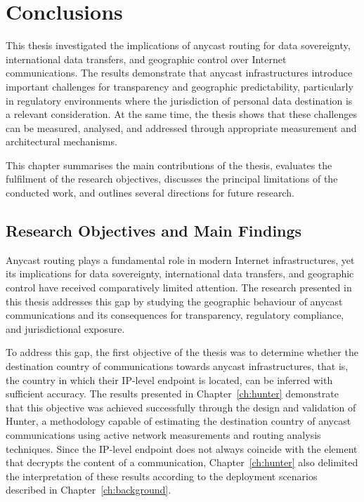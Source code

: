 \chapter{Conclusions}
\label{ch:conclusion}

This thesis investigated the implications of anycast routing for data sovereignty, international data transfers, and geographic control over Internet communications. The results demonstrate that anycast infrastructures introduce important challenges for transparency and geographic predictability, particularly in regulatory environments where the jurisdiction of personal data destination is a relevant consideration. At the same time, the thesis shows that these challenges can be measured, analysed, and addressed through appropriate measurement and architectural mechanisms.

This chapter summarises the main contributions of the thesis, evaluates the fulfilment of the research objectives, discusses the principal limitations of the conducted work, and outlines several directions for future research.

\section{Research Objectives and Main Findings}
\label{sc:conclusion_objectives}

Anycast routing plays a fundamental role in modern Internet infrastructures, yet its implications for data sovereignty, international data transfers, and geographic control have received comparatively limited attention. The research presented in this thesis addresses this gap by studying the geographic behaviour of anycast communications and its consequences for transparency, regulatory compliance, and jurisdictional exposure.

To address this gap, the first objective of the thesis was to determine whether the destination country of communications towards anycast infrastructures, that is, the country in which their IP-level endpoint is located, can be inferred with sufficient accuracy. The results presented in Chapter~\ref{ch:hunter} demonstrate that this objective was achieved successfully through the design and validation of Hunter, a methodology capable of estimating the destination country of anycast communications using active network measurements and routing analysis techniques. Since the IP-level endpoint does not always coincide with the element that decrypts the content of a communication, Chapter~\ref{ch:hunter} also delimited the interpretation of these results according to the deployment scenarios described in Chapter~\ref{ch:background}.

